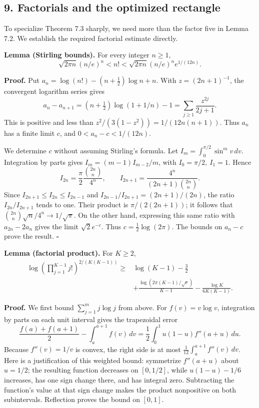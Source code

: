 \documentclass[
  11pt,
  a4paper,
]{article}
\begin{document}
\subsection{9. Factorials and the optimized
rectangle}\label{factorials-and-the-optimized-rectangle}

To specialize Theorem 7.3 sharply, we need more than the factor five in
Lemma 7.2. We establish the required factorial estimate directly.

\textbf{Lemma (Stirling bounds).} For every integer \(n\ge1\), \[
\sqrt{2\pi n}(n/e)^n<n!
<\sqrt{2\pi n}(n/e)^n e^{1/(12n)}.
\]

\textbf{Proof.} Put \(a_n=\log(n!)-(n+\tfrac12)\log n+n\). With
\(z=(2n+1)^{-1}\), the convergent logarithm series gives \[
a_n-a_{n+1}
=(n+\tfrac12)\log(1+1/n)-1
=\sum_{j\ge1}\frac{z^{2j}}{2j+1}.
\] This is positive and less than \(z^2/(3(1-z^2))=1/(12n(n+1))\). Thus
\(a_n\) has a finite limit \(c\), and \(0<a_n-c<1/(12n)\).

We determine \(c\) without assuming Stirling's formula. Let
\(I_m=\int_0^{\pi/2}\sin^m v\,dv\). Integration by parts gives
\(I_m=(m-1)I_{m-2}/m\), with \(I_0=\pi/2,\ I_1=1\). Hence \[
I_{2n}=\frac{\pi}{2}\frac{\binom{2n}{n}}{4^n},\qquad
I_{2n+1}=\frac{4^n}{(2n+1)\binom{2n}{n}}.
\] Since \(I_{2n+1}\le I_{2n}\le I_{2n-1}\) and
\(I_{2n-1}/I_{2n+1}=(2n+1)/(2n)\), the ratio \(I_{2n}/I_{2n+1}\) tends
to one. Their product is \(\pi/(2(2n+1))\); it follows that
\(\binom{2n}{n}\sqrt n/4^n\to1/\sqrt\pi\). On the other hand, expressing
this same ratio with \(a_{2n}-2a_n\) gives the limit \(\sqrt2e^{-c}\).
Thus \(c=\tfrac12\log(2\pi)\). The bounds on \(a_n-c\) prove the result.
\(\square\)

\textbf{Lemma (factorial product).} For \(K\ge2\), \[
\begin{aligned}
\log\left(\prod_{j=1}^{K-1}j!\right)^{2/(K(K-1))}
\ge{}&\log(K-1)-\frac32\\
&+\frac{\log(2\pi(K-1)/\sqrt e)}{K-1}
-\frac{\log K}{6K(K-1)}.
\end{aligned} \tag{7.21}
\]

\textbf{Proof.} We first bound \(\sum_{j=1}^m j\log j\) from above. For
\(f(v)=v\log v\), integration by parts on each unit interval gives the
trapezoidal error \[
\frac{f(a)+f(a+1)}2-\int_a^{a+1}f(v)\,dv
=\frac12\int_0^1 u(1-u)f''(a+u)\,du.
\] Because \(f''(v)=1/v\) is convex, the right side is at most
\(\tfrac1{12}\int_a^{a+1}f''(v)\,dv\). Here is a justification of this
weighted bound: symmetrize \(f''(a+u)\) about \(u=1/2\); the resulting
function decreases on \([0,1/2]\), while \(u(1-u)-1/6\) increases, has
one sign change there, and has integral zero. Subtracting the function's
value at that sign change makes the product nonpositive on both
subintervals. Reflection proves the bound on \([0,1]\).
\end{document}
